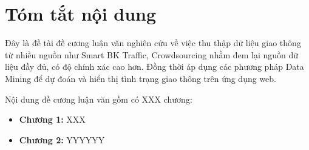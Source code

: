 \documentclass[
11pt, %
english,%
singlespacing, %
parskip, %
headsepline, %
]{MastersDoctoralThesis} %
\begin{document}
\chapter{Tóm tắt nội dung}
Đây là đề tài đề cương luận văn nghiên cứu về việc thu thập dữ liệu giao thông từ nhiều nguồn như Smart BK Traffic, Crowdsourcing nhằm đem lại nguồn dữ liệu đầy đủ, có độ chính xác cao hơn. Đồng thời áp dụng các phương pháp Data Mining để dự đoán và hiển thị tình trạng giao thông trên ứng dụng web.

Nội dung đề cương luận văn gồm có XXX chương:
\begin{itemize}
\item \textbf{Chương 1:} XXX
\item \textbf{Chương 2:} YYYYYY
\end{itemize}




\tableofcontents %

\listoffigures %

\listoftables %
\end{document}

